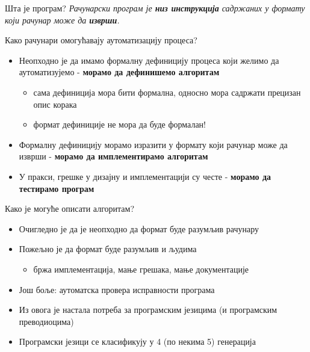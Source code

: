 \documentclass[xcolor=table]{beamer}
\begin{document}
    \begin{frame}{Шта је програм?}
        \textit{Рачунарски програм је \textbf{низ инструкција} садржаних у формату који рачунар може да \textbf{изврши}.}
    \end{frame}

    \begin{frame}{Како рачунари омогућавају аутоматизацију процеса?}
        \begin{itemize}
            \item Неопходно је да имамо формалну дефиницију процеса који желимо да аутоматизујемо - \textbf{морамо да дефинишемо алгоритам}
            \begin{itemize}
                \item сама дефиниција мора бити формална, односно мора садржати прецизан опис корака
                \item формат дефиниције не мора да буде формалан!
            \end{itemize}
            \item Формалну дефиницију морамо изразити у формату који рачунар може да изврши - \textbf{морамо да имплементирамо алгоритам}
            \item У пракси, грешке у дизајну и имплементацији су честе - \textbf{морамо да тестирамо програм}
        \end{itemize}
    \end{frame}

    \begin{frame}{Како је могуће описати алгоритам?}
        \begin{itemize}
            \item Очигледно је да је неопходно да формат буде разумљив рачунару
            \item Пожељно је да формат буде разумљив и људима
            \begin{itemize}
                \item бржа имплементација, мање грешака, мање документације
            \end{itemize}
            \item Још боље: аутоматска провера исправности програма
            \item Из овога је настала потреба за програмским језицима (и програмским преводиоцима)
            \item Програмски језици се класификују у 4 (по некима 5) генерација
        \end{itemize}
    \end{frame}
    
\end{document}
